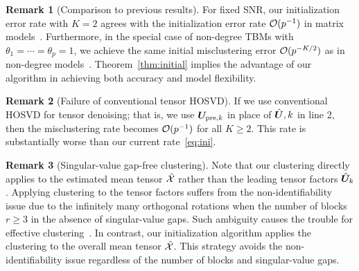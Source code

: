\documentclass[journal]{IEEEtran}
\theoremstyle{definition}
\theoremstyle{definition}
\newtheorem{rmk}{Remark}
\begin{document}
\begin{rmk}[Comparison to previous results] For fixed SNR, our initialization error rate with $K=2$ agrees with the initialization error rate $\mathcal{O}(p^{-1})$ in matrix models~\citep{gao2018community}. Furthermore, in the special case of non-degree TBMs with $\theta_1=\cdots=\theta_p=1$, we achieve the same initial misclustering error $\mathcal{O}(p^{-K/2})$ as in non-degree models~\citep{han2020exact}. Theorem~\ref{thm:initial} implies the advantage of our algorithm in achieving both accuracy and model flexibility. 
\end{rmk}


\begin{rmk}[Failure of conventional tensor HOSVD] If we use conventional HOSVD for tensor denoising; that is, we use $\bm{U}_{\text{pre},k}$ in place of $\hat {\bm{U}},k$ in line 2, then the misclustering rate becomes $\mathcal{O}(p^{-1})$ for all $K\geq 2$. This rate is substantially worse than our current rate~\eqref{eq:ini}.
\end{rmk}


\begin{rmk}[Singular-value gap-free clustering] Note that our clustering directly applies to the estimated mean tensor $\hat {\mathcal{X}}$ rather than the leading tensor factors $\hat {\bm{U}}_k$. Applying clustering to the tensor factors suffers from the non-identifiability issue due to the infinitely many orthogonal rotations when the number of blocks $r \geq 3$ in the absence of singular-value gaps. 
Such ambiguity causes the trouble for effective clustering~\citep{abbe2020entrywise}. In contrast, our initialization algorithm applies the clustering to the overall mean tensor $\hat {\mathcal{X}}$. This strategy avoids the non-identifiability issue regardless of the number of blocks and singular-value gaps.  
\end{rmk}
\end{document}
